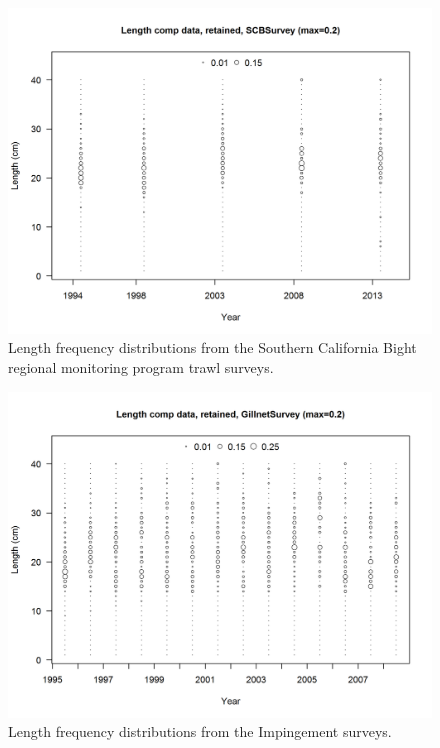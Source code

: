 \documentclass[12pt,]{article}
\begin{document}
\begin{figure}[htbp]
\centering
\includegraphics{r4ss/plots_mod1/comp_lendat_bubflt11mkt2.png}
\caption{Length frequency distributions from the Southern California
Bight regional monitoring program trawl surveys.
\label{fig:Fleet11_SCBsurvey_lendat_bubflt11mkt2}}
\end{figure}

\begin{figure}[htbp]
\centering
\includegraphics{r4ss/plots_mod1/comp_lendat_bubflt9mkt2.png}
\caption{Length frequency distributions from the Impingement surveys.
\label{fig:Fleet9_GillnetSurvey_lendat_bubflt10mkt2}}
\end{figure}
\end{document}
